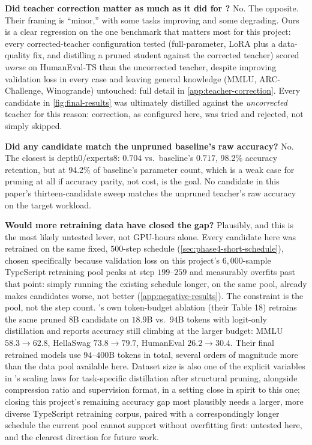 \documentclass{article}
\theoremstyle{plain}
\theoremstyle{definition}
\theoremstyle{remark}
\begin{document}
\textbf{Did teacher correction matter as much as it did for
\citet{minitron2024practice}?} No. The opposite. Their framing is
``minor,'' with some tasks improving and some degrading. Ours is a clear
regression on the one benchmark that matters most for this project:
every corrected-teacher configuration tested (full-parameter, LoRA plus
a data-quality fix, and distilling a pruned student against the
corrected teacher) scored \emph{worse} on HumanEval-TS than the
uncorrected teacher, despite improving validation loss in every case
and leaving general knowledge (MMLU, ARC-Challenge, Winogrande)
untouched: full detail in \cref{app:teacher-correction}. Every
candidate in
\cref{fig:final-results} was ultimately distilled against the
\emph{uncorrected} teacher for this reason: correction, as configured
here, was tried and rejected, not simply skipped.

\textbf{Did any candidate match the unpruned baseline's raw accuracy?}
No. The closest is depth0/experts8: $0.704$ vs.\ baseline's $0.717$,
98.2\% accuracy retention, but at 94.2\% of baseline's parameter
count, which is a weak case for pruning at all if accuracy parity, not
cost, is the goal. No candidate in this paper's thirteen-candidate
sweep matches the unpruned teacher's raw accuracy on the target
workload.

\textbf{Would more retraining data have closed the gap?} Plausibly, and
this is the most likely untested lever, not GPU-hours alone. Every
candidate here was retrained on the same fixed, $500$-step schedule
(\cref{sec:phase4-short-schedule}), chosen specifically because
validation loss on this project's $6{,}000$-sample TypeScript
retraining pool peaks at step $199$--$259$ and measurably overfits past
that point: simply running the existing schedule longer, on the same
pool, already makes candidates worse, not better
(\cref{app:negative-results}). The constraint is the pool, not the step
count. \citet{minitron2024}'s own token-budget ablation (their Table 18)
retrains the same pruned 8B candidate on $18.9$B vs.\ $94$B tokens with
logit-only distillation and reports accuracy still climbing at the
larger budget: MMLU $58.3 \to 62.8$, HellaSwag $73.8 \to 79.7$,
HumanEval $26.2 \to 30.4$. Their final retrained models use $94$--$400$B
tokens in total, several orders of magnitude more than the data pool
available here. Dataset size is also one of the explicit variables in
\citet{scalinglaws2026}'s scaling laws for task-specific distillation
after structural pruning, alongside compression ratio and supervision
format, in a setting close in spirit to this one; closing this
project's remaining accuracy gap most plausibly needs a larger, more
diverse TypeScript retraining corpus, paired with a correspondingly
longer schedule the current pool cannot support without overfitting
first: untested here, and the clearest direction for future work.
\end{document}
